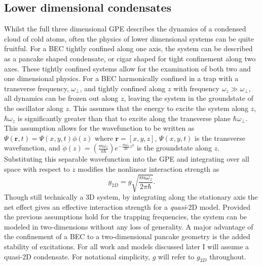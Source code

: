 \subsection{Lower dimensional condensates}\label{sub:coldatom_recent}
Whilst the full three dimensional GPE describes the dynamics of a condensed cloud of cold atoms, often the physics of lower dimensional systems can be quite fruitful. For a BEC tightly confined along one axis, the system can be described as a pancake shaped condensate, or cigar shaped for tight confinement along two axes. These tightly confined systems allow for the examination of both two and one dimensional physics. For a BEC harmonically confined in a trap with a transverse frequency, $\omega_\perp$, and tightly confined along $z$ with frequency $\omega_z \gg \omega_\perp$, all dynamics can be frozen out along $z$, leaving the system in the groundstate of the oscillator along $z$. This assumes that the energy to excite the system along $z$, $\hbar\omega_z$ is significantly greater than that to excite along the transverse plane $\hbar\omega_\perp$. This assumption allows for the wavefunction to be written as $\Psi(\mathbf{r},t) = \Psi(x,y,t)\phi(z)$ where $\mathbf{r} = [x,y,z]$, $\Psi(x,y,t)$ is the transverse wavefunction, and $\phi(z) = \left(\frac{m\omega_z}{\pi\hbar}\right)e^{-\frac{m\omega_z}{2\hbar}z^2}$ is the groundstate along $z$.
Substituting this separable wavefunction into the GPE and integrating over all space with respect to $z$ modifies the nonlinear interaction strength as
\begin{equation}
    g_{2D} = g\sqrt{\frac{m\omega_z}{2\pi\hbar}}.
\end{equation}
Though still technically a 3D system, by integrating along the stationary axis the net effect gives an effective interaction strength for a \textit{quasi}-2D model. Provided the previous assumptions hold for the trapping frequencies, the system can be modeled in two-dimensions without any loss of generality. A major advantage of the confinement of a BEC to a two-dimensional pancake geometry is the added stability of excitations. For all work and models discussed later I will assume a quasi-2D condensate. For notational simplicity, $g$ will refer to $g_{2D}$ throughout.
